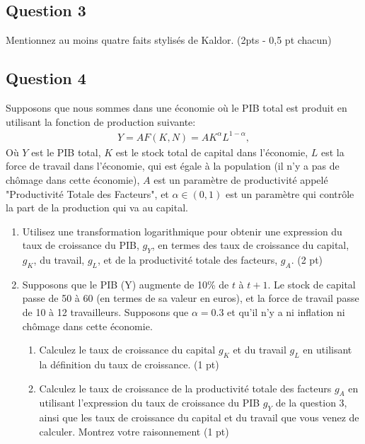 \documentclass[11pt]{article}
\begin{document}
\subsection*{Question 3}
Mentionnez au moins quatre faits stylisés de Kaldor. (2pts - 0,5 pt chacun)

\subsection*{Question 4}
Supposons que nous sommes dans une économie où le PIB total est produit en utilisant la fonction de production suivante:
\begin{align*}
    Y = A F(K,N) = A K^{\alpha} L^{1-\alpha},
\end{align*}
Où \(Y\) est le PIB total, \(K\) est le stock total de capital dans l'économie, \(L\) est la force de travail dans 
l'économie, qui est égale à la population (il n'y a pas de chômage dans cette économie), \(A\) est un paramètre de productivité appelé "Productivité Totale des Facteurs", et \(\alpha \in (0,1)\) est un paramètre qui contrôle la part de la production qui va au capital.

\begin{enumerate}
    \item Utilisez une transformation logarithmique pour obtenir une expression du taux de croissance du PIB, \(g_Y\), en termes des taux de croissance du capital, \(g_K\), du travail, \(g_L\), et de la productivité totale des facteurs, \(g_A\). (2 pt)
    \item Supposons que le PIB (Y) augmente de 10\% de \(t\) à \(t+1\). Le stock de capital passe de 50 à 60 (en termes de sa valeur en euros), et la force de travail passe de 10 à 12 travailleurs. Supposons que \(\alpha = 0.3\) et qu'il n'y a ni inflation ni chômage dans cette économie.
    \begin{enumerate}
        \item Calculez le taux de croissance du capital \(g_K\) et du travail \(g_L\) en utilisant la définition du taux de croissance. (1 pt)
        \item Calculez le taux de croissance de la productivité totale des facteurs \(g_A\) en utilisant l'expression du taux de croissance du PIB \(g_Y\) de la question 3, ainsi que les taux de croissance du capital et du travail que vous venez de calculer. Montrez votre raisonnement (1 pt)
    \end{enumerate}
\end{enumerate}
\end{document}
